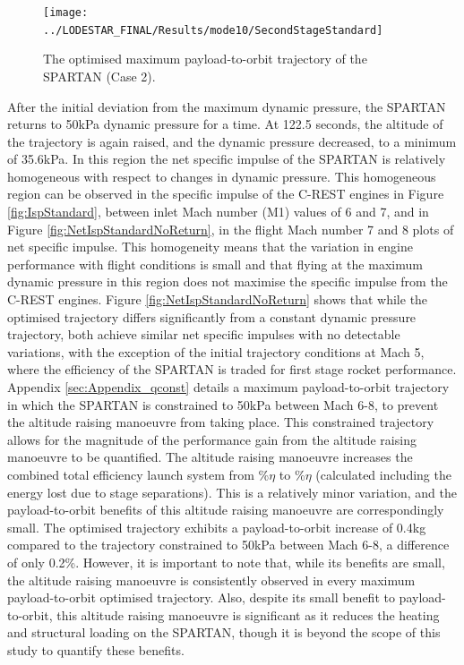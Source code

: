 \begin{figure}[ht!]
\centering
\texttt{[image: ../LODESTAR\_FINAL/Results/mode10/SecondStageStandard]}
\caption{The optimised maximum payload-to-orbit trajectory of the SPARTAN (Case 2).}
\label{fig:SecondStageStandardNoReturn}
\end{figure}



After the initial deviation from the maximum dynamic pressure, the SPARTAN returns to 50kPa dynamic pressure for a time. 
At 122.5 seconds, the altitude of the trajectory is again raised, and the dynamic pressure decreased, to a minimum of 35.6kPa. In this region the net specific impulse of the SPARTAN is relatively homogeneous with respect to changes in dynamic pressure. This homogeneous region can be observed in the specific impulse of the C-REST engines in Figure \ref{fig:IspStandard}, between inlet Mach number (M1) values of 6 and 7, and in Figure \ref{fig:NetIspStandardNoReturn}, in the flight Mach number 7 and 8 plots of net specific impulse. This homogeneity means that the variation in engine performance with flight conditions is small and that flying at the maximum dynamic pressure in this region does not maximise the specific impulse from the C-REST engines. Figure \ref{fig:NetIspStandardNoReturn} shows that while the optimised trajectory differs significantly from a constant dynamic pressure trajectory, both achieve similar net specific impulses with no detectable variations, with the exception of the initial trajectory conditions at Mach 5, where the efficiency of the SPARTAN is traded for first stage rocket performance. 
Appendix \ref{sec:Appendix_qconst} details a maximum payload-to-orbit trajectory in which the SPARTAN is constrained to 50kPa between Mach 6-8, to prevent the altitude raising manoeuvre from taking place. This constrained trajectory allows for the magnitude of the performance gain from the altitude raising manoeuvre to be quantified. 
The altitude raising manoeuvre
increases the combined total efficiency launch system from \totalExergyEffqconstrained \%$\eta$ to \totalExergyEffStandardNoReturn \%$\eta$ (calculated including the energy lost due to stage separations). This is a relatively minor variation, and the payload-to-orbit benefits of this altitude raising manoeuvre are correspondingly small. 
The optimised trajectory exhibits a payload-to-orbit increase of 0.4kg compared to the trajectory constrained to 50kPa between Mach 6-8, a difference of only 0.2\%.
However, it is important to note that, while its benefits are small, the altitude raising manoeuvre is consistently observed in every maximum payload-to-orbit optimised trajectory. 
Also, despite its small benefit to payload-to-orbit, this altitude raising manoeuvre is significant as it reduces the heating and structural loading on the SPARTAN, though it is beyond the scope of this study to quantify these benefits. 




